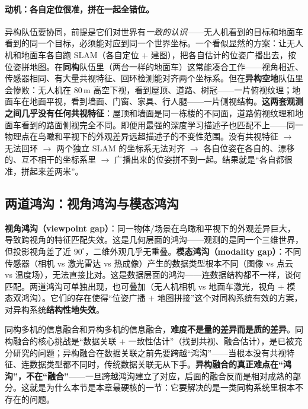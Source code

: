 \paragraph{动机：各自定位很准，拼在一起全错位。}
异构队伍要协同，前提是它们对世界有\emph{一致的认识}——无人机看到的目标和地面车看到的同一个目标，必须能对应到同一个世界坐标。一个看似显然的方案：让无人机和地面车各自跑 SLAM（各自定位 $+$ 建图），把各自估计的位姿广播出去，按位姿拼地图。在\textbf{同构}队伍里（两台一样的地面车）这常能凑合工作——视角相近、传感器相同、有大量共视特征、回环检测能对齐两个坐标系。但在\textbf{异构空地}队伍里会惨败：无人机在 $80\,\mathrm{m}$ 高空下视，看到屋顶、道路、树冠——一片俯视纹理；地面车在地面平视，看到墙面、门窗、家具、行人腿——一片侧视结构。\textbf{这两套观测之间几乎没有任何共视特征}：屋顶和墙面是同一栋楼的不同面，道路俯视纹理和地面车看到的路面侧视完全不同。即便用最强的深度学习描述子也匹配不上——同一物理点在鸟瞰和平视下的外观差异远超描述子的不变性范围。没有共视特征 $\to$ 无法回环 $\to$ 两个独立 SLAM 的坐标系无法对齐 $\to$ 各自位姿在各自的、漂移的、互不相干的坐标系里 $\to$ 广播出来的位姿拼不到一起。结果就是“各自都很准，拼起来差两米”。

\subsection{两道鸿沟：视角鸿沟与模态鸿沟}
\label{sec:hmr-perception-gaps}
\textbf{视角鸿沟（viewpoint gap）}：同一物体/场景在鸟瞰和平视下的外观差异巨大，导致跨视角的特征匹配失效。这是几何层面的鸿沟——观测的是同一个三维世界，但投影视角差了近 $90^\circ$，二维外观几乎无重叠。\textbf{模态鸿沟（modality gap）}：不同传感器（相机 vs 激光雷达 vs 热成像）产生的数据类型根本不同（图像 vs 点云 vs 温度场），无法直接比对。这是数据层面的鸿沟——连数据结构都不一样，谈何匹配。两道鸿沟可单独出现，也可叠加（无人机相机 vs 地面车激光，视角 $+$ 模态双鸿沟）。它们的存在使得“位姿广播 $+$ 地图拼接”这个对同构系统有效的方案，对异构系统\textbf{结构性地失效}。

\begin{insight}[异构融合的真正难点在“鸿沟”，不在“融合”]
同构多机的信息融合和异构多机的信息融合，\textbf{难度不是量的差异而是质的差异}。同构融合的核心挑战是“数据关联 $+$ 一致性估计”（找到共视、融合估计），是已被充分研究的问题；异构融合在数据关联之前先要跨越“鸿沟”——当根本没有共视特征、连数据类型都不同时，传统数据关联无从下手。\textbf{异构融合的真正难点在“鸿沟”，不在“融合”}——一旦跨越鸿沟建立了对应，后面的融合反而是相对成熟的部分。这就是为什么本节是本章最硬核的一节：它要解决的是一类同构系统里根本不存在的问题。
\end{insight}

